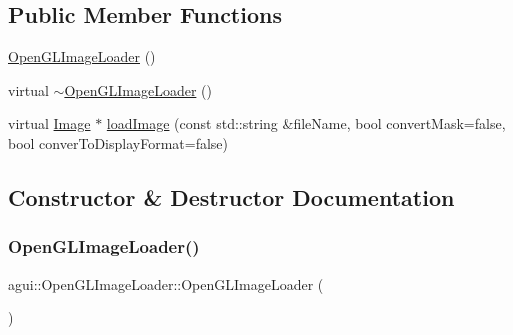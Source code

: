 \subsection*{Public Member Functions}
\begin{DoxyCompactItemize}
\item 
\mbox{\hyperlink{classagui_1_1_open_g_l_image_loader_afef741cd01e9bc4eec31d8716b5c627f}{Open\+G\+L\+Image\+Loader}} ()
\item 
virtual \mbox{\hyperlink{classagui_1_1_open_g_l_image_loader_a55fd0b531c3690c36df8570945027e55}{$\sim$\+Open\+G\+L\+Image\+Loader}} ()
\item 
virtual \mbox{\hyperlink{class_image}{Image}} $\ast$ \mbox{\hyperlink{classagui_1_1_open_g_l_image_loader_a8a72a6652077e5302924b541ba3d2cef}{load\+Image}} (const std\+::string \&file\+Name, bool convert\+Mask=false, bool conver\+To\+Display\+Format=false)
\end{DoxyCompactItemize}


\subsection{Constructor \& Destructor Documentation}
\mbox{\label{classagui_1_1_open_g_l_image_loader_afef741cd01e9bc4eec31d8716b5c627f}} 
\subsubsection{\texorpdfstring{Open\+G\+L\+Image\+Loader()}{OpenGLImageLoader()}}
{\footnotesize\ttfamily agui\+::\+Open\+G\+L\+Image\+Loader\+::\+Open\+G\+L\+Image\+Loader (\begin{DoxyParamCaption}{ }\end{DoxyParamCaption})\hspace{0.3cm}{\ttfamily [explicit]}}

\mbox{\label{classagui_1_1_open_g_l_image_loader_a55fd0b531c3690c36df8570945027e55}} 
